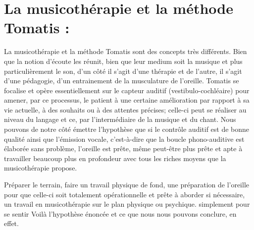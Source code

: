 \section{La musicothérapie et la méthode Tomatis : }
La musicothérapie et la méthode Tomatis sont des concepts très différents. Bien que la notion d'écoute les réunit, bien que leur medium soit la musique et plus particulièrement le son, d'un côté il s'agit d'une thérapie et de l'autre, il s'agit d'une pédagogie, d'un entrainement de la musculature de l'oreille. 
Tomatis se focalise et opère essentiellement sur le capteur auditif (vestibulo-cochléaire) pour amener, par ce processus, le patient à une certaine  amélioration par rapport à sa vie actuelle, à des souhaits ou à des attentes précises; celle-ci peut se réaliser au niveau du langage et ce, par l'intermédiaire de la musique et du chant. Nous pouvons de notre côté  émettre l'hypothèse que si le contrôle auditif est de bonne qualité ainsi que l'émission vocale, c'est-à-dire que la boucle phono-auditive est élaborée sans problème, l'oreille est prête, même peut-être plus prête et apte à travailler beaucoup plus en profondeur avec tous les riches moyens que la musicothérapie propose.


Préparer le terrain, faire un travail physique de fond, une préparation de l'oreille pour que celle-ci soit totalement opérationnelle et prête à aborder si nécessaire, un travail en musicothérapie sur le plan physique ou psychique. simplement pour se sentir 
Voilà l'hypothèse énoncée et ce que nous nous pouvons conclure, en effet.